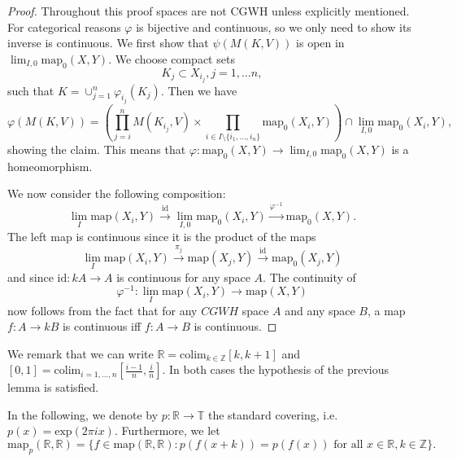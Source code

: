 \documentclass[8pt, oneside]{article}
\theoremstyle{definition}
\newcommand{\RR}{\mathbb{R}}
\newcommand{\ZZ}{\mathbb{Z}}
\newcommand{\TT}{\mathbb{T}}
\newcommand{\colim}{\mathrm{colim}}
\newcommand{\map}{\mathrm{map}}
\begin{document}
\begin{proof}
Throughout this proof spaces are not CGWH unless explicitly mentioned.
For categorical reasons $\varphi$ is bijective and continuous, so 
we only need to show its inverse is continuous. We first show
that $\psi(M(K,V))$ is open in $\lim_{I,0}\map_0(X,Y)$. We choose compact sets 
$$K_{j}\subset X_{i_j}, j=1,\ldots n,$$ such that
$K = \cup_{j=1}^n \varphi_{i_j}(K_{j})$. Then we
have 
$$\varphi(M(K,V)) = \left(\prod_{j = i}^n M(K_{i_j}, V)\times \prod_{i\in I\setminus \{i_1,\ldots, i_n\}}
\map_0(X_i, Y)\right)\cap \lim_{I, 0} \map_0(X_i, Y),$$
showing the claim. This means that $\varphi: \map_0(X,Y) \to \lim_{I,0} \map_0(X, Y)$
is a homeomorphism. 

We now consider the following composition:
$$
\lim_I \map(X_i, Y)
\xrightarrow{\mathrm{id}}
\lim_{I,0} \map_0(X_i, Y)
\xrightarrow{\varphi^{-1}}
\map_0(X,Y).
$$
The left map is continuous since it is the product of the maps
$$\lim_I \map(X_i, Y)\xrightarrow{\pi_j} \map(X_j, Y)\xrightarrow{\mathrm{id}}
\map_0(X_j, Y)$$
and since $\mathrm{id}: kA\to A$ is continuous 
for any space $A$. 
The continuity of $$\varphi^{-1}: \lim_I \map(X_i,Y)\to \map(X, Y)$$
 now follows from the fact that for any $CGWH$ space $A$ and any space $B$,
a map $f:A\to kB$ is continuous iff $f:A\to B$ is continuous.
\end{proof}

We remark that we can write $\RR = \colim_{k\in \ZZ} [k, k+1]$
and $[0,1] = \colim_{i=1,\ldots, n} [\frac{i-1}{n}, \frac in]$. In both cases the
hypothesis of the previous lemma is satisfied.

In the following, we denote by $p:\RR\to \TT$  the 
standard covering, i.e. $p(x) = \mathrm{exp}(2\pi i x)$. Furthermore,
we let $$\map_p(\RR,\RR) = \{f\in \map(\RR, \RR): p(f(x+k)) = p(f(x)) \text{ for all }
x\in \RR, k\in \ZZ\}.$$
\end{document}
